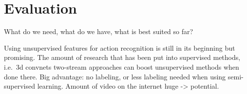 \section{Evaluation}
What do we need, what do we have, what is best suited so far?

Using unsupervised features for action recognition is still in its beginning but promising.
The amount of research that has been put into supervised methods, i.e.\ 3d convnets two-stream approaches can boost unsupervised methods when done there.
Big advantage: no labeling, or less labeling needed when using semi-supervised learning.
Amount of video on the internet huge -> potential.
